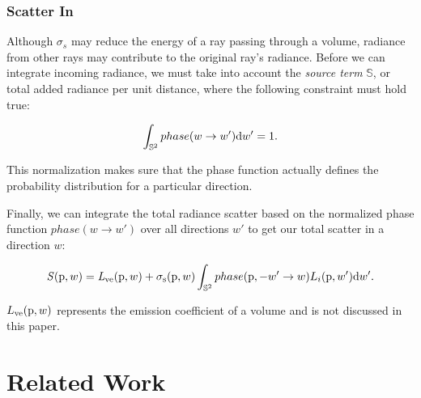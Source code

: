 \documentclass[12pt]{ucthesis}
\begin{document}
\subsection{Scatter In}
Although $\sigma_{s}$ may reduce the energy of a ray passing through a volume, radiance from other rays may contribute to the original ray's radiance.  Before we can integrate incoming radiance, we must take into account the \textit{source term} $\mathbb{S}$, or total added radiance per unit distance, where the following constraint must hold true:

\begin{equation}
\int_{\mathbb{S}^2}phase(w \to w')\textup{d}w' = 1.
\label{source_eq}
\end{equation}

This normalization makes sure that the phase function actually defines the probability distribution for a particular direction.

Finally, we can integrate the total radiance scatter based on the normalized phase function $phase(w \to w')$ over all directions $w'$ to get our total scatter in a direction $w$:

\begin{displaymath}
\mathit{S}(\textup{p},w) = \mathit{L}_{\textup{ve}}(\textup{p},w) + \sigma_{\textup{s}}(\textup{p}, w) \int_{\mathbb{S}^2} phase(\textup{p}, -w' \to w) L_{i}(\textup{p},w')\textup{d}w'.
\end{displaymath}

$L_{\textup{ve}}(\textup{p}, w)$ represents the emission coefficient of a volume and is not discussed in this paper.




\chapter{Related Work}
\end{document}
